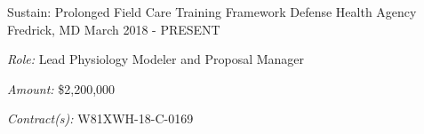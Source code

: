 \begin{cventries}
  \cventry
    {Sustain: Prolonged Field Care Training Framework} %
    {Defense Health Agency} %
    {Fredrick, MD} %
    {March 2018 - PRESENT} %
     {
     \begin{cvitems}
     \item{\textit{Role:} Lead Physiology Modeler and Proposal Manager}
     \item{\textit{Amount:} \$2,200,000}
     \item{\textit{Contract(s):} W81XWH-18-C-0169}
     \end{cvitems}
     }




\end{cventries}
